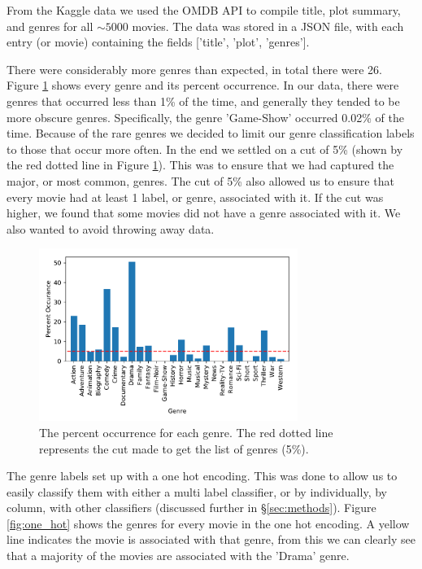 \documentclass[11pt]{article}
\begin{document}
From the Kaggle data we used the OMDB API to compile title, plot summary, and genres for all $\sim5000$ movies. The data was stored in a JSON file, with each entry (or movie) containing the fields ['title', 'plot', 'genres'].

There were considerably more genres than expected, in total there were 26. Figure \ref{fig:genres} shows every genre and its percent occurrence. In our data, there were genres that occurred less than 1\% of the time, and generally they tended to be more obscure genres. Specifically, the genre 'Game-Show' occurred 0.02\% of the time. Because of the rare genres we decided to limit our genre classification labels to those that occur more often. In the end we settled on a cut of 5\% (shown by the red dotted line in Figure \ref{fig:genres}). This was to ensure that we had captured the major, or most common, genres. The cut of 5\% also allowed us to ensure that every movie had at least 1 label, or genre, associated with it. If the cut was higher, we found that some movies did not have a genre associated with it. We also wanted to avoid throwing away data. 

\begin{figure}[ht]
	\centering
		\includegraphics[width=0.75\textwidth]{genres.pdf}
	\caption{The percent occurrence for each genre. The red dotted line represents the cut made to get the list of genres (5\%).}
	\label{fig:genres}
\end{figure}

The genre labels set up with a one hot encoding. This was done to allow us to easily classify them with either a multi label classifier, or by individually, by column, with other classifiers (discussed further in \S \ref{sec:methods}). Figure \ref{fig:one_hot} shows the genres for every movie in the one hot encoding. A yellow line indicates the movie is associated with that genre, from this we can clearly see that a majority of the movies are associated with the 'Drama' genre.
\end{document}
